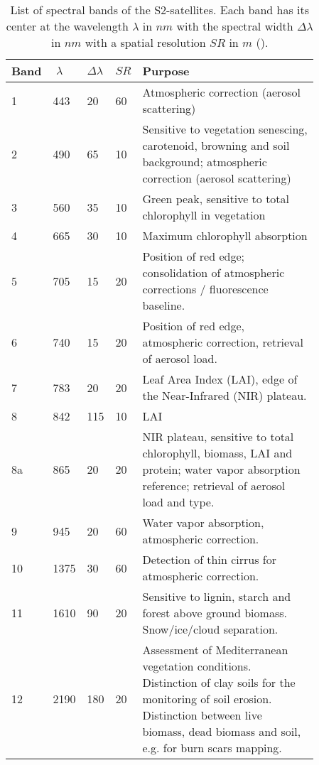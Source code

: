 \begin{table}[h]
    \centering
    \small
    \caption{List of spectral bands of the S2-satellites. Each band has its center at the wavelength $\lambda$ in $nm$ with the spectral width $\Delta\lambda$ in $nm$ with a spatial resolution $SR$ in $m$ (\cite{jaramazESASentinel2Mission2013}).}
    \begin{tabular}{p{0.03\linewidth} p{0.04\linewidth} p{0.03\linewidth} p{0.03\linewidth} p{0.73\linewidth}}
    \toprule
        \hspace*{-5pt} Band & $\;\lambda$ & $\Delta\lambda$ & $SR$ & Purpose \\ \hline
        1 & 443 & 20 & 60 & Atmospheric correction (aerosol scattering) \\ %
        2 & 490 & 65 & 10 & Sensitive to vegetation senescing, carotenoid, browning and soil background; atmospheric correction (aerosol scattering) \\ %
        3 & 560 & 35 & 10 & Green peak, sensitive to total chlorophyll in vegetation \\ %
        4 & 665 & 30 & 10 & Maximum chlorophyll absorption \\ %
        5 & 705 & 15 & 20 & Position of red edge; consolidation of atmospheric corrections / fluorescence baseline. \\ %
        6 & 740 & 15 & 20 & Position of red edge, atmospheric correction, retrieval of aerosol load. \\ %
        7 & 783 & 20 & 20 & Leaf Area Index (LAI), edge of the Near-Infrared (NIR) plateau. \\ %
        8 & 842 & 115 & 10 & LAI \\ %
        8a & 865 & 20 & 20 & NIR plateau, sensitive to total chlorophyll, biomass, LAI and protein; water vapor absorption reference; retrieval of aerosol load and type. \\ %
        9 & 945 & 20 & 60 & Water vapor absorption, atmospheric correction. \\ %
        10 & 1375 & 30 & 60 & Detection of thin cirrus for atmospheric correction. \\ %
        11 & 1610 & 90 & 20 & Sensitive to lignin, starch and forest above ground biomass. Snow/ice/cloud separation. \\ %
        12 & 2190 & 180 & 20 & Assessment of Mediterranean vegetation conditions. Distinction of clay soils for the monitoring of soil erosion. Distinction between live biomass, dead biomass and soil, e.g. for burn scars mapping. \\
        \bottomrule
    \end{tabular}
    \label{table:S2-bands}
\end{table}
